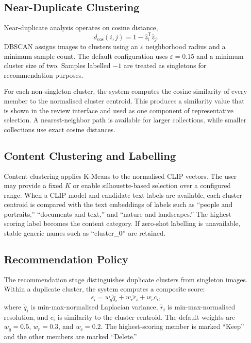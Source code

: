 \documentclass[conference]{IEEEtran}
\begin{document}
\subsection{Near-Duplicate Clustering}
Near-duplicate analysis operates on cosine distance,
\begin{equation}
    d_{\mathrm{cos}}(i,j) = 1 - \hat{z}_i^{\mathsf{T}}\hat{z}_j.
\end{equation}
DBSCAN assigns images to clusters using an $\varepsilon$ neighborhood radius and a minimum sample count. The default configuration uses $\varepsilon=0.15$ and a minimum cluster size of two. Samples labelled $-1$ are treated as singletons for recommendation purposes.

For each non-singleton cluster, the system computes the cosine similarity of every member to the normalised cluster centroid. This produces a similarity value that is shown in the review interface and used as one component of representative selection. A nearest-neighbor path is available for larger collections, while smaller collections use exact cosine distances.

\subsection{Content Clustering and Labelling}
Content clustering applies K-Means to the normalised CLIP vectors. The user may provide a fixed $K$ or enable silhouette-based selection over a configured range. When a CLIP model and candidate text labels are available, each cluster centroid is compared with the text embeddings of labels such as ``people and portraits,'' ``documents and text,'' and ``nature and landscapes.'' The highest-scoring label becomes the content category. If zero-shot labelling is unavailable, stable generic names such as ``cluster\_0'' are retained.

\subsection{Recommendation Policy}
The recommendation stage distinguishes duplicate clusters from singleton images. Within a duplicate cluster, the system computes a composite score:
\begin{equation}
    s_i = w_q\tilde{q}_i + w_r\tilde{r}_i + w_c c_i,
\end{equation}
where $\tilde{q}_i$ is min-max-normalised Laplacian variance, $\tilde{r}_i$ is min-max-normalised resolution, and $c_i$ is similarity to the cluster centroid. The default weights are $w_q=0.5$, $w_r=0.3$, and $w_c=0.2$. The highest-scoring member is marked ``Keep'' and the other members are marked ``Delete.''
\end{document}
